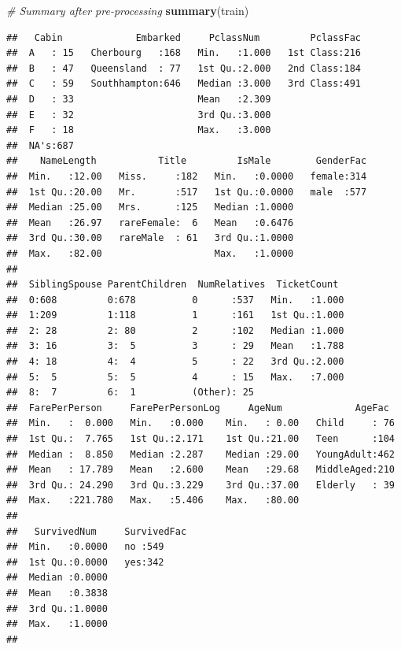 \documentclass[]{article}
\newenvironment{Shaded}{\begin{snugshade}}{\end{snugshade}}
\newcommand{\KeywordTok}[1]{\textcolor[rgb]{0.13,0.29,0.53}{\textbf{#1}}}
\newcommand{\CommentTok}[1]{\textcolor[rgb]{0.56,0.35,0.01}{\textit{#1}}}
\newcommand{\NormalTok}[1]{#1}
\begin{document}
\begin{Shaded}
\begin{Highlighting}[]
\CommentTok{# Summary after pre-processing}
\KeywordTok{summary}\NormalTok{(train)}
\end{Highlighting}
\end{Shaded}

\begin{verbatim}
##   Cabin             Embarked     PclassNum         PclassFac  
##  A   : 15   Cherbourg   :168   Min.   :1.000   1st Class:216  
##  B   : 47   Queensland  : 77   1st Qu.:2.000   2nd Class:184  
##  C   : 59   Southhampton:646   Median :3.000   3rd Class:491  
##  D   : 33                      Mean   :2.309                  
##  E   : 32                      3rd Qu.:3.000                  
##  F   : 18                      Max.   :3.000                  
##  NA's:687                                                     
##    NameLength           Title         IsMale        GenderFac  
##  Min.   :12.00   Miss.     :182   Min.   :0.0000   female:314  
##  1st Qu.:20.00   Mr.       :517   1st Qu.:0.0000   male  :577  
##  Median :25.00   Mrs.      :125   Median :1.0000               
##  Mean   :26.97   rareFemale:  6   Mean   :0.6476               
##  3rd Qu.:30.00   rareMale  : 61   3rd Qu.:1.0000               
##  Max.   :82.00                    Max.   :1.0000               
##                                                                
##  SiblingSpouse ParentChildren  NumRelatives  TicketCount   
##  0:608         0:678          0      :537   Min.   :1.000  
##  1:209         1:118          1      :161   1st Qu.:1.000  
##  2: 28         2: 80          2      :102   Median :1.000  
##  3: 16         3:  5          3      : 29   Mean   :1.788  
##  4: 18         4:  4          5      : 22   3rd Qu.:2.000  
##  5:  5         5:  5          4      : 15   Max.   :7.000  
##  8:  7         6:  1          (Other): 25                  
##  FarePerPerson     FarePerPersonLog     AgeNum             AgeFac   
##  Min.   :  0.000   Min.   :0.000    Min.   : 0.00   Child     : 76  
##  1st Qu.:  7.765   1st Qu.:2.171    1st Qu.:21.00   Teen      :104  
##  Median :  8.850   Median :2.287    Median :29.00   YoungAdult:462  
##  Mean   : 17.789   Mean   :2.600    Mean   :29.68   MiddleAged:210  
##  3rd Qu.: 24.290   3rd Qu.:3.229    3rd Qu.:37.00   Elderly   : 39  
##  Max.   :221.780   Max.   :5.406    Max.   :80.00                   
##                                                                     
##   SurvivedNum     SurvivedFac
##  Min.   :0.0000   no :549    
##  1st Qu.:0.0000   yes:342    
##  Median :0.0000              
##  Mean   :0.3838              
##  3rd Qu.:1.0000              
##  Max.   :1.0000              
## 
\end{verbatim}
\end{document}
